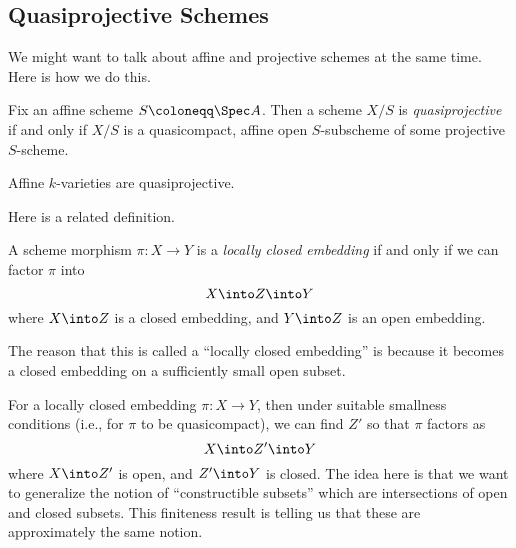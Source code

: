 \documentclass[../notes.tex]{subfiles}
\begin{document}
\subsection{Quasiprojective Schemes}
We might want to talk about affine and projective schemes at the same time. Here is how we do this.
\begin{definition}[Quasiprojective]
	Fix an affine scheme $S\coloneqq\Spec A$. Then a scheme $X/S$ is \textit{quasiprojective} if and only if $X/S$ is a quasicompact, affine open $S$-subscheme of some projective $S$-scheme.
\end{definition}
\begin{example}
	Affine $k$-varieties are quasiprojective.
\end{example}
Here is a related definition.
\begin{definition}
	A scheme morphism $\pi\colon X\to Y$ is a \textit{locally closed embedding} if and only if we can factor $\pi$ into
	\[X\into Z\into Y\]
	where $X\into Z$ is a closed embedding, and $Y\into Z$ is an open embedding.
\end{definition}
The reason that this is called a ``locally closed embedding'' is because it becomes a closed embedding on a sufficiently small open subset.
\begin{remark}
	For a locally closed embedding $\pi\colon X\to Y$, then under suitable smallness conditions (i.e., for $\pi$ to be quasicompact), we can find $Z'$ so that $\pi$ factors as
	\[X\into Z'\into Y\]
	where $X\into Z'$ is open, and $Z'\into Y$ is closed. The idea here is that we want to generalize the notion of ``constructible subsets'' which are intersections of open and closed subsets. This finiteness result is telling us that these are approximately the same notion.
\end{remark}
\end{document}
